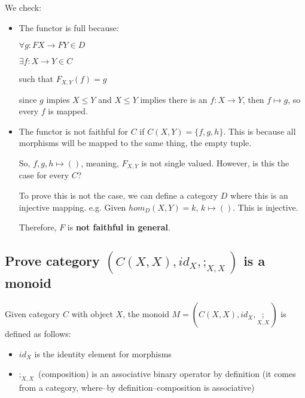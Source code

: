 \documentclass[../main.tex]{subfiles}
\begin{document}
We check:
\begin{itemize}

\item The functor is full because:

$\forall g : F X \rightarrow F Y \in D$

\quad $\exists f : X \rightarrow Y \in C$

\qquad such that $F_{X,Y}(f) = g$

since $g$ impies $X \leq Y$ and $X \leq Y$ implies there is an $f : X \rightarrow Y$, then $f \mapsto g$, so every $f$ is mapped.

\item The functor is not faithful for $C$ if $C(X,Y) = \{f,g,h\}$. This is because all morphisms will be mapped to the same thing, the empty tuple.

So, $f,g,h \mapsto ()$, meaning, $F_{X,Y}$ is not single valued. However, is this the case for every $C$?

To prove this is not the case, we can define a category $D$ where this is an injective mapping. e.g. Given $hom_D(X,Y) = {k}$, $k \mapsto ()$. This is injective.

Therefore, $F$ is \textbf{not faithful in general}.

\end{itemize}

\subsection{Prove category $(C(X,X), id_X, ;_{X,X})$ is a monoid}

Given category $C$ with object $X$, the monoid $M = (C(X,X), id_X, \underset{X,X};)$ is defined as follows:
\begin{itemize}
  \item $id_X$ is the identity element for morphisms
  \item $;_{X,X}$ (composition) is an associative binary operator by definition (it comes from a category, where--by definition--composition is associative)
\end{itemize}
\end{document}
